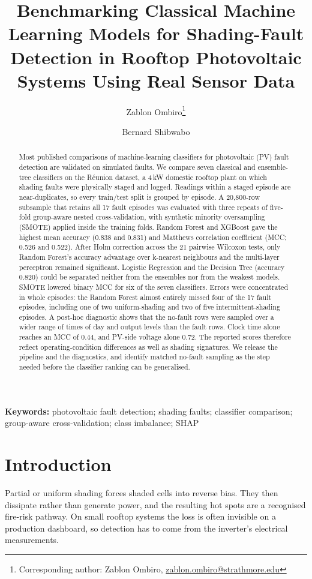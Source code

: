 \documentclass[11pt,a4paper]{article}
\title{Benchmarking Classical Machine Learning Models for Shading-Fault Detection in Rooftop Photovoltaic Systems Using Real Sensor Data}
\author[1]{Zablon Ombiro\thanks{Corresponding author: Zablon Ombiro, \href{mailto:zablon.ombiro@strathmore.edu}{zablon.ombiro@strathmore.edu}}}
\author[1]{Bernard Shibwabo}
\affil[1]{School of Computing and Engineering Sciences, Strathmore University, Nairobi, Kenya}
\date{}
\begin{document}
\maketitle

\begin{abstract}
Most published comparisons of machine-learning classifiers for photovoltaic (PV) fault detection are validated on simulated faults. We compare seven classical and ensemble-tree classifiers on the R\'eunion dataset, a 4\,kW domestic rooftop plant on which shading faults were physically staged and logged. Readings within a staged episode are near-duplicates, so every train/test split is grouped by episode. A 20{,}800-row subsample that retains all 17 fault episodes was evaluated with three repeats of five-fold group-aware nested cross-validation, with synthetic minority oversampling (SMOTE) applied inside the training folds. Random Forest and XGBoost gave the highest mean accuracy (0.838 and 0.831) and Matthews correlation coefficient (MCC; 0.526 and 0.522). After Holm correction across the 21 pairwise Wilcoxon tests, only Random Forest's accuracy advantage over k-nearest neighbours and the multi-layer perceptron remained significant. Logistic Regression and the Decision Tree (accuracy 0.820) could be separated neither from the ensembles nor from the weakest models. SMOTE lowered binary MCC for six of the seven classifiers. Errors were concentrated in whole episodes: the Random Forest almost entirely missed four of the 17 fault episodes, including one of two uniform-shading and two of five intermittent-shading episodes. A post-hoc diagnostic shows that the no-fault rows were sampled over a wider range of times of day and output levels than the fault rows. Clock time alone reaches an MCC of 0.44, and PV-side voltage alone 0.72. The reported scores therefore reflect operating-condition differences as well as shading signatures. We release the pipeline and the diagnostics, and identify matched no-fault sampling as the step needed before the classifier ranking can be generalised.
\end{abstract}

\noindent\textbf{Keywords:} photovoltaic fault detection; shading faults; classifier comparison; group-aware cross-validation; class imbalance; SHAP

\section{Introduction}

Partial or uniform shading forces shaded cells into reverse bias. They then dissipate rather than generate power, and the resulting hot spots are a recognised fire-risk pathway. On small rooftop systems the loss is often invisible on a production dashboard, so detection has to come from the inverter's electrical measurements.
\end{document}
